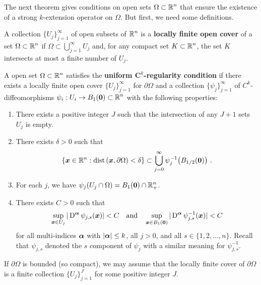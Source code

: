 The next theorem gives conditions on open sets
$\displaystyle \Omega \subset \mathbb{R}^n$
that ensure the existence of a strong $k$-extension operator on $\Omega$.
But first, we need some definitions.

\begin{defn}
A collection $\displaystyle \{ U_j \}_{j=1}^\infty$ of open subsets of
$\displaystyle \mathbb{R}^n$ is a {\bfseries locally finite open cover}%
 of a set
$\displaystyle \Omega \subset \mathbb{R}^n$ if
$\displaystyle \Omega \subset \bigcup_{j=1}^\infty U_j$ and,
for any compact set $\displaystyle K \subset \mathbb{R}^n$, the set $K$
intersects at most a finite number of $U_j$.
\end{defn}

\begin{defn} \label{UnifKregDefn}
A open set $\displaystyle \Omega \subset \mathbb{R}^n$ satisfies the
{\bfseries uniform $\displaystyle \mathbf C^k$-regularity condition}%
 if there exists
a locally finite open cover
$\displaystyle \{ U_j \}_{j=1}^\infty$ for $\partial \Omega$ and a collection 
$\displaystyle \{ \psi_j \}_{j=1}^\infty$ of $\displaystyle C^k$-diffeomorphisms 
$\displaystyle \psi_i: U_i \to B_{1}({\bm{0}}) \subset \mathbb{R}^n$ with the following
properties:
\begin{enumerate}
\item There exists a positive integer $J$ such that the intersection
of any $J+1$ sets $U_j$ is empty.
\item There exists $\delta >0$ such that
\[
\left\{ \VEC{x} \in \RR^n :
\dist{\VEC{x}}{\partial \Omega}  < \delta \right\}
\subset \bigcup_{j=0}^\infty \psi_j^{-1}\big(B_{1/2}(\VEC{0})\big) \ .
\]
\item For each $j$, we have
$\displaystyle \psi_j(U_j\cap \Omega) = B_{1}({\bm{0}}) \cap \mathbb{R}^n_+$.
\item There exists $C>0$ such that
\[
\sup_{{\bm{x}}\in U_j} |\operatorname{D}^{{\bm{\alpha}}}\psi_{j,s}({\bm{x}})| < C
\quad \text{and} \quad
\sup_{{\bm{x}}\in B_{1}({\bm{0}})} |\operatorname{D}^{{\bm{\alpha}}}\psi^{-1}_{j,s}({\bm{x}})| < C
\]
for all multi-indices ${\bm{\alpha}}$ with $|{\bm{\alpha}}|\leq k$, all
$j > 0$, and all $s \in \{1,2,\ldots, n\}$.  Recall that
$\psi_{j,s}$ denoted the $s$ component of $\psi_j$ with a similar
meaning for $\displaystyle \psi^{-1}_{j,s}$.
\end{enumerate}
If $\partial \Omega$ is bounded (so compact), we may assume that
the locally finite cover of $\partial \Omega$ is a finite collection
$\displaystyle \{ U_j \}_{j=1}^J$ for some positive integer $J$.
\end{defn}

